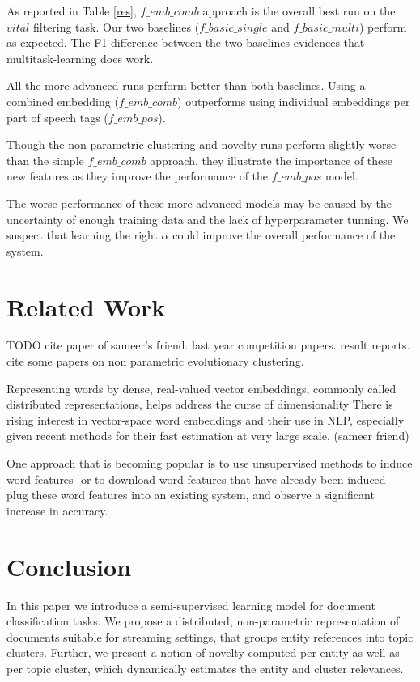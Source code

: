 \documentclass{article}
\begin{document}
As reported in Table \ref{res}, $f\_emb\_comb$ approach is the overall best run on the $vital$ filtering task. Our two baselines ($f\_basic\_single$ and $f\_basic\_multi$) perform as expected. The F1 difference between the two baselines evidences that multitask-learning does work.

All the more advanced runs perform better than both baselines. Using a combined embedding ($f\_emb\_comb$) outperforms using individual embeddings per part of speech tags ($f\_emb\_pos$).

Though the non-parametric clustering and novelty runs perform slightly worse than the simple $f\_emb\_comb$ approach, they illustrate the importance of these new features as they improve the performance of the $f\_emb\_pos$ model.

The worse performance of these more advanced models may be caused by the uncertainty of enough training data and the lack of hyperparameter tunning. We suspect that learning the right $\alpha$ could improve the overall performance of the system.

\section{Related Work}
\label{related}

TODO 
cite paper of sameer's friend.
last year competition papers. result reports.
cite some papers on non parametric evolutionary clustering.

Representing words by dense, real-valued vector embeddings, commonly called distributed representations, helps address the curse of dimensionality
There is rising interest in vector-space word embeddings and their use in NLP, especially given recent methods for their fast estimation at very large scale. (sameer friend)

One approach that is becoming popular is to use unsupervised methods to induce word features -or to download word features that have already been induced- plug these word features into an existing system, and observe a significant increase in accuracy.

\section{Conclusion}
\label{conclusion}

In this paper we introduce a semi-supervised learning model for document classification tasks. We propose a distributed, non-parametric representation of documents suitable for streaming settings, that groups entity references into topic clusters. Further, we present a notion of novelty computed per entity as well as per topic cluster, which dynamically estimates the entity and cluster relevances.
\end{document}
